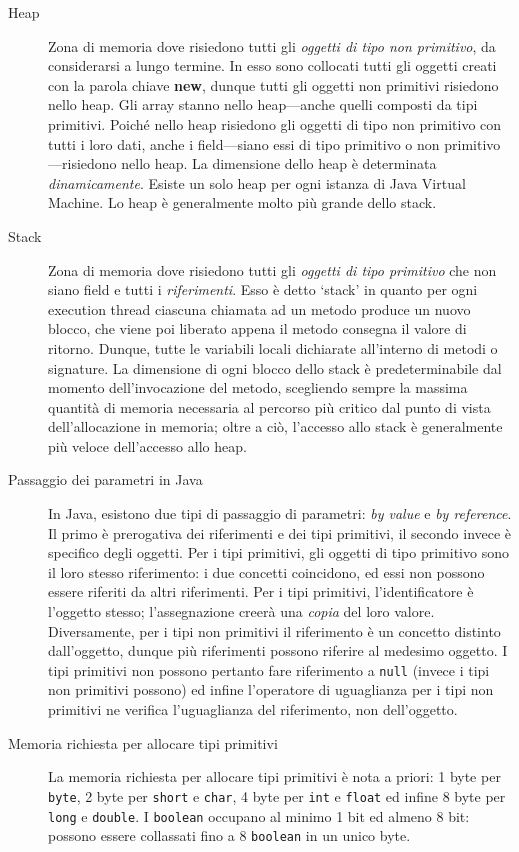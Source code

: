 \documentclass[\fontsizeclass,twocolumn]{\classname}
\theoremstyle{definition}
\theoremstyle{definition}
\begin{document}
\begin{description}
    \item[Heap] Zona di memoria dove risiedono tutti gli \emph{oggetti di tipo non primitivo}, da considerarsi a lungo termine. In esso sono collocati tutti gli oggetti creati con la parola chiave \textbf{new}, dunque tutti gli oggetti non primitivi risiedono nello heap. Gli array stanno nello heap---anche quelli composti da tipi primitivi. Poiché nello heap risiedono gli oggetti di tipo non primitivo con tutti i loro dati, anche i field---siano essi di tipo primitivo o non primitivo---risiedono nello heap. La dimensione dello heap è determinata \emph{dinamicamente}. Esiste un solo heap per ogni istanza di Java Virtual Machine. Lo heap è generalmente molto più grande dello stack.
    \item[Stack] Zona di memoria dove risiedono tutti gli \emph{oggetti di tipo primitivo} che non siano field e tutti i \emph{riferimenti}. Esso è detto `stack' in quanto per ogni execution thread ciascuna chiamata ad un metodo produce un nuovo blocco, che viene poi liberato appena il metodo consegna il valore di ritorno. Dunque, tutte le variabili locali dichiarate all'interno di metodi o signature. La dimensione di ogni blocco dello stack è predeterminabile dal momento dell'invocazione del metodo, scegliendo sempre la massima quantità di memoria necessaria al percorso più critico dal punto di vista dell'allocazione in memoria; oltre a ciò, l'accesso allo stack è generalmente più veloce dell'accesso allo heap.
    \item[Passaggio dei parametri in Java] In Java, esistono due tipi di passaggio di parametri: \emph{by value} e \emph{by reference}. Il primo è prerogativa dei riferimenti e dei tipi primitivi, il secondo invece è specifico degli oggetti. Per i tipi primitivi, gli oggetti di tipo primitivo sono il loro stesso riferimento: i due concetti coincidono, ed essi non possono essere riferiti da altri riferimenti. Per i tipi primitivi, l'identificatore è l'oggetto stesso; l'assegnazione creerà una \emph{copia} del loro valore. Diversamente, per i tipi non primitivi il riferimento è un concetto distinto dall'oggetto, dunque più riferimenti possono riferire al medesimo oggetto. I tipi primitivi non possono pertanto fare riferimento a \texttt{null} (invece i tipi non primitivi possono) ed infine l'operatore di uguaglianza per i tipi non primitivi ne verifica l'uguaglianza del riferimento, non dell'oggetto.
    \item[Memoria richiesta per allocare tipi primitivi] La memoria richiesta per allocare tipi primitivi è nota a priori: 1 byte per \texttt{byte}, 2 byte per \texttt{short} e \texttt{char}, 4 byte per \texttt{int} e \texttt{float} ed infine 8 byte per \texttt{long} e \texttt{double}. I \texttt{boolean} occupano al minimo 1 bit ed almeno 8 bit: possono essere collassati fino a 8 \texttt{boolean} in un unico byte. 

\end{description}
\end{document}
